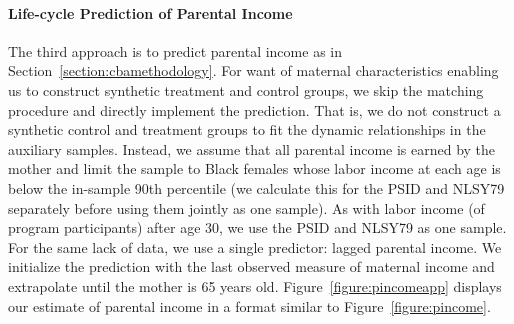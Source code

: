 \paragraph{Life-cycle Prediction of Parental Income} \label{appendix:lcyclepincome}

\noindent The third approach is to predict parental income as in Section~\ref{section:cbamethodology}. For want of maternal characteristics enabling us to construct synthetic treatment and control groups, we skip the matching procedure and directly implement the prediction. That is, we do not construct a synthetic control and treatment groups to fit the dynamic relationships in the auxiliary samples. Instead, we assume that all parental income is earned by the mother and limit the sample to Black females whose labor income at each age is below the in-sample 90th percentile (we calculate this for the PSID and NLSY79 separately before using them jointly as one sample). As with labor income (of program participants) after age 30, we use the PSID and NLSY79 as one sample. For the same lack of data, we use a single predictor: lagged parental income. We initialize the prediction with the last observed measure of maternal income and extrapolate until the mother is 65 years old. Figure~\ref{figure:pincomeapp} displays our estimate of parental income in a format similar to Figure~\ref{figure:pincome}.\\


